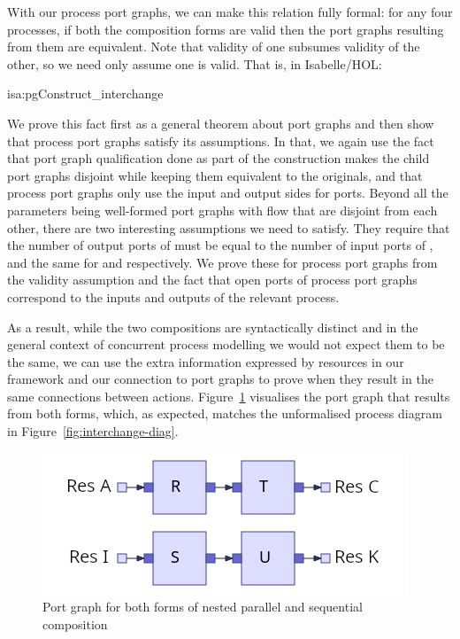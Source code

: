 \documentclass[class=smolathesis,crop=false]{standalone}
\begin{document}
With our process port graphs, we can make this relation fully formal: for any four processes, if both the composition forms are valid then the port graphs resulting from them are equivalent.
Note that validity of one subsumes validity of the other, so we need only assume one is valid.
That is, in Isabelle/HOL:
\begin{isalemma}{isa:pgConstruct_interchange}
  
\end{isalemma}

We prove this fact first as a general theorem about port graphs and then show that process port graphs satisfy its assumptions.
In that, we again use the fact that port graph qualification done as part of the construction makes the child port graphs disjoint while keeping them equivalent to the originals, and that process port graphs only use the input and output sides for ports.
Beyond all the parameters being well-formed port graphs with flow that are disjoint from each other, there are two interesting assumptions we need to satisfy.
They require that the number of output ports of  must be equal to the number of input ports of , and the same for  and  respectively.
We prove these for process port graphs from the validity assumption and the fact that open ports of process port graphs correspond to the inputs and outputs of the relevant process.

As a result, while the two compositions are syntactically distinct and in the general context of concurrent process modelling we would not expect them to be the same, we can use the extra information expressed by resources in our framework and our connection to port graphs to prove when they result in the same connections between actions.
Figure~\ref{fig:interchange_port_graph} visualises the port graph that results from both forms, which, as expected, matches the unformalised process diagram in Figure~\ref{fig:interchange-diag}.

\begin{figure}[hbtp]
  \centering
  \includegraphics[scale=0.5]{img/interchange_port_graph.png}
  \caption{Port graph for both forms of nested parallel and sequential composition}
  \label{fig:interchange_port_graph}
\end{figure}
\end{document}
